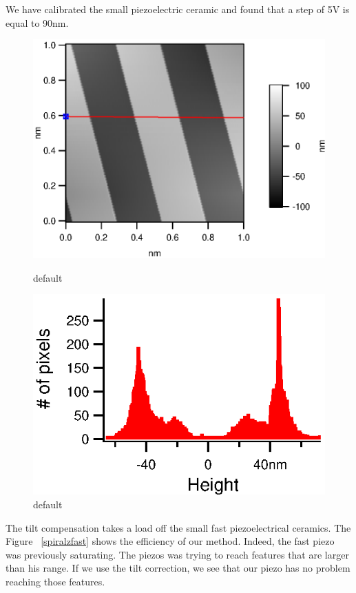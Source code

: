 We have calibrated the small piezoelectric ceramic and found that a step of 5V is equal to 90nm.
\begin{figure}[ht]
\begin{minipage}[b]{0.45\linewidth}
\centering
\includegraphics[width=\textwidth]{images/Calib1vPP_HeightMap.eps}
\caption{default}
\label{fig:figure1}
\end{minipage}
\hspace{0.5cm}
\begin{minipage}[b]{0.45\linewidth}
\centering
\includegraphics[width=\textwidth]{images/Calib1VppHisto.eps}
\caption{default}
\label{fig:figure2}
\end{minipage}
\end{figure}

The tilt compensation takes a load off the small fast piezoelectrical ceramics. The Figure ~\ref{spiralzfast} shows the efficiency of our method. Indeed, the fast piezo was previously saturating. The piezos was trying to reach features that are larger than his range. If we use the tilt correction, we see that our piezo has no problem reaching those features.


